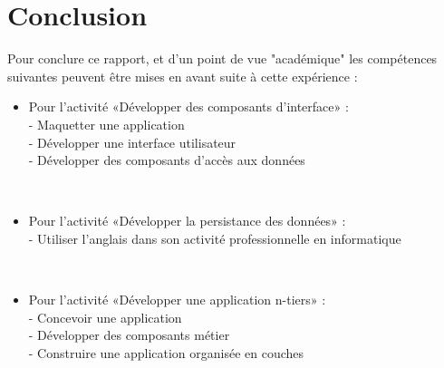 \chapter{Conclusion}
\label{Conclusion}

Pour conclure ce rapport, et d'un point de vue "académique" les compétences suivantes peuvent être mises en avant suite à cette expérience :
\renewcommand{\labelitemi}{\textbullet}
\\
\begin{itemize}
\item Pour l’activité «Développer des composants d'interface» :\\
- Maquetter une application\\
- Développer une interface utilisateur\\
- Développer des composants d’accès aux données\\
\end{itemize}
\\
\begin{itemize}
\item Pour l’activité «Développer la persistance des données» :\\
- Utiliser l’anglais dans son activité professionnelle en informatique\\
\end{itemize}
\\
\begin{itemize}
\item Pour l’activité «Développer une application n-tiers» :\\
- Concevoir une application\\
- Développer des composants métier\\
- Construire une application organisée en couches\\
\end{itemize}